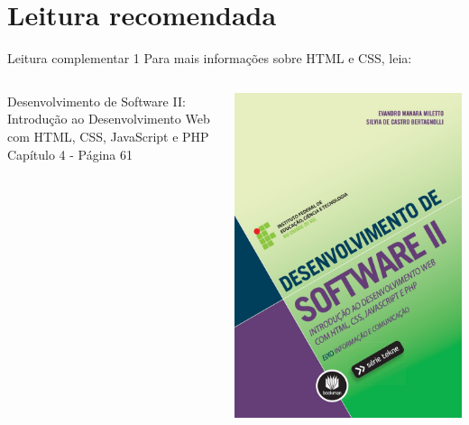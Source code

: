 \documentclass{beamer}
\begin{document}
\section{Leitura recomendada}
\begin{frame}{Leitura complementar 1}
 Para mais informações sobre HTML e CSS, leia:\\
 \begin{columns}
   \begin{column}{0.5\textwidth}
    Desenvolvimento de Software II: Introdução ao Desenvolvimento Web com HTML, CSS, JavaScript e PHP \\
     Capítulo 4 - Página 61\\ 
      \cite{miletto2014desenvolvimento}
   \end{column}
   \begin{column}{0.3\textwidth}
    \begin{center}
  \includegraphics[height=0.45\paperheight]{fig/aula3/milleto2014.jpeg} \\
 \end{center}
   \end{column}
 \end{columns}
\end{frame}
\end{document}
